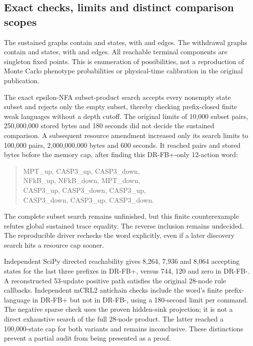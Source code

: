 \subsection{Exact checks, limits and distinct comparison scopes}

The sustained graphs contain \DRBasePlusStates{} and \DRBaseMinusStates{}
states, with \DRBasePlusEdges{} and \DRBaseMinusEdges{} edges. The withdrawal
graphs contain \DRControlPlusStates{} and \DRControlMinusStates{} states,
with \DRControlPlusEdges{} and \DRControlMinusEdges{} edges. All reachable
terminal components are singleton fixed points. This is enumeration of
possibilities, not a reproduction of Monte Carlo phenotype probabilities or
physical-time calibration in the original publication.

The exact epsilon-NFA subset-product search accepts every nonempty state
subset and rejects only the empty subset, thereby checking prefix-closed
finite weak languages without a depth cutoff. The original limits of 10,000
subset pairs, 250,000,000 stored bytes and 180 seconds did not decide the
sustained comparison. A subsequent resource amendment increased only its
search limits to 100,000 pairs, 2,000,000,000 bytes and 600 seconds. It reached
\DRBaseSubsetPairs{} pairs and \DRBaseSubsetBytes{} stored bytes before the
memory cap, after finding this DR-FB+-only 12-action word:
\begin{quote}\small\raggedright
MPT\_up, CASP3\_up, CASP3\_down,\\
NFkB\_up, NFkB\_down, MPT\_down,\\
CASP3\_up, CASP3\_down, CASP3\_up,\\
CASP3\_down, CASP3\_up, CASP3\_down.
\end{quote}
The complete subset search remains unfinished, but this finite counterexample
refutes global sustained trace equality. The reverse inclusion remains
undecided. The reproducible driver rechecks the word explicitly, even if a
later discovery search hits a resource cap sooner.

Independent SciPy directed reachability gives 8,264, 7,936 and 8,064 accepting
states for the last three prefixes in DR-FB+, versus 744, 120 and zero in
DR-FB-. A reconstructed 53-update positive path satisfies the original
28-node rule callbacks. Independent mCRL2 antichain checks include the word's
finite prefix-language in DR-FB+ but not in DR-FB-, using a 180-second limit
per command. The negative sparse check uses the proven hidden-sink projection;
it is not a direct exhaustive search of the full 28-node product. The latter
reached a 100,000-state cap for both variants and remains inconclusive.
These distinctions prevent a partial audit from being presented as a proof.

